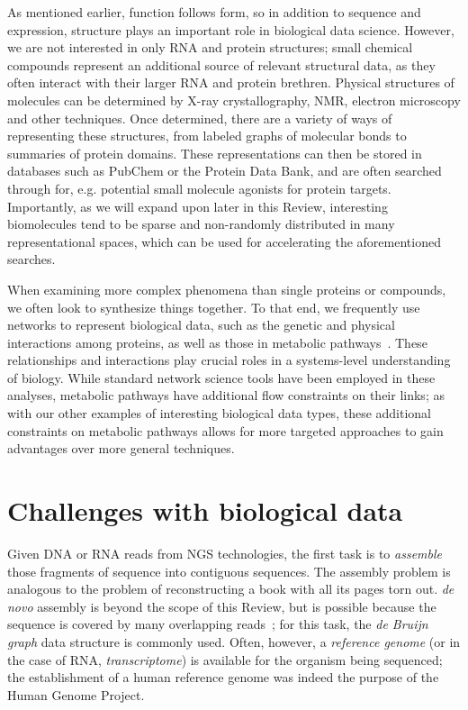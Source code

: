 \documentclass{acm_proc_article-sp}
\begin{document}
As mentioned earlier, function follows form, so in addition to
sequence and expression, structure plays an important role in biological data science.
However, we are not interested in only RNA and protein structures;
small chemical compounds represent an additional source of relevant structural data,
as they often interact with their larger RNA and protein brethren.
Physical structures of molecules can be determined by X-ray crystallography, NMR, electron microscopy and other 
techniques.
Once determined, there are a variety of ways of representing these structures, from labeled graphs of molecular bonds to summaries of protein domains.
These representations can then be stored in databases such as PubChem or the Protein Data Bank,
and are often searched through for, e.g. potential small molecule agonists for protein targets.
Importantly, as we will expand upon later in this Review, interesting biomolecules tend to be sparse and non-randomly distributed in many representational spaces, which can be used for accelerating the aforementioned searches.

When examining more complex phenomena than single proteins or compounds, we
often look to synthesize things together.
To that end, we frequently use
networks to represent biological data, such as the genetic
and physical interactions among proteins, as well as those in metabolic 
pathways~\cite{berger2013computational}.
These relationships and interactions play crucial roles in a systems-level understanding of biology.
While standard network science tools have been employed in these analyses, metabolic pathways have additional flow constraints on their links;
as with our other examples of interesting biological data types, these additional constraints on metabolic pathways allows for more targeted approaches to gain advantages over more general techniques.

\section{Challenges with biological data}

Given DNA or RNA reads from NGS technologies, the first task is to 
\emph{assemble} those fragments of sequence into contiguous sequences.
The assembly problem is analogous to the problem of 
reconstructing a book with all its pages torn out.
\emph{de novo} assembly is beyond the scope of this Review, but is
possible because the sequence is covered by many
overlapping reads~\cite{berger2013computational}; for this task, the \emph{de Bruijn graph}
data structure is commonly used.
Often, however, a \emph{reference genome} (or in the case of RNA, 
\emph{transcriptome}) is available for the organism being sequenced; the
establishment of a human reference genome was indeed the purpose of the Human
Genome Project.
\end{document}
